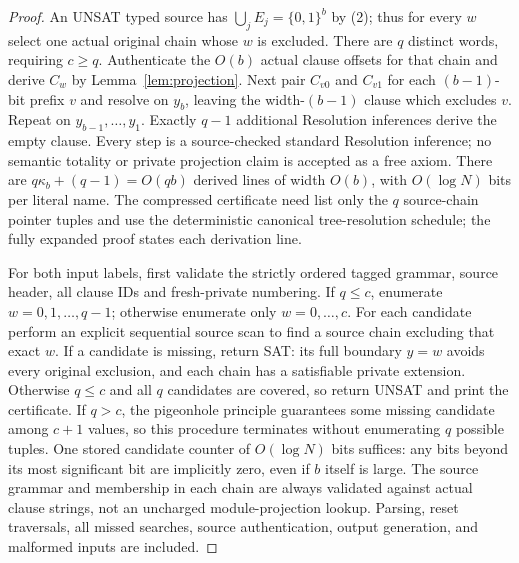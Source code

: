 \begin{proof}
An UNSAT typed source has $\bigcup_jE_j=\{0,1\}^b$ by (2); thus for every $w$ select one actual original chain whose $w$ is excluded. There are $q$ distinct words, requiring $c\ge q$. Authenticate the $O(b)$ actual clause offsets for that chain and derive $C_w$ by Lemma~\ref{lem:projection}. Next pair $C_{v0}$ and $C_{v1}$ for each $(b-1)$-bit prefix $v$ and resolve on $y_b$, leaving the width-$(b-1)$ clause which excludes $v$. Repeat on $y_{b-1},\ldots,y_1$. Exactly $q-1$ additional Resolution inferences derive the empty clause. Every step is a source-checked standard Resolution inference; no semantic totality or private projection claim is accepted as a free axiom. There are $q\kappa_b+(q-1)=O(qb)$ derived lines of width $O(b)$, with $O(\log N)$ bits per literal name. The compressed certificate need list only the $q$ source-chain pointer tuples and use the deterministic canonical tree-resolution schedule; the fully expanded proof states each derivation line.

For both input labels, first validate the strictly ordered tagged grammar, source header, all clause IDs and fresh-private numbering. If $q\le c$, enumerate $w=0,1,\ldots,q-1$; otherwise enumerate only $w=0,\ldots,c$. For each candidate perform an explicit sequential source scan to find a source chain excluding that exact $w$. If a candidate is missing, return SAT: its full boundary $y=w$ avoids every original exclusion, and each chain has a satisfiable private extension. Otherwise $q\le c$ and all $q$ candidates are covered, so return UNSAT and print the certificate. If $q>c$, the pigeonhole principle guarantees some missing candidate among $c+1$ values, so this procedure terminates without enumerating $q$ possible tuples. One stored candidate counter of $O(\log N)$ bits suffices: any bits beyond its most significant bit are implicitly zero, even if $b$ itself is large. The source grammar and membership in each chain are always validated against actual clause strings, not an uncharged module-projection lookup. Parsing, reset traversals, all missed searches, source authentication, output generation, and malformed inputs are included.\end{proof}

